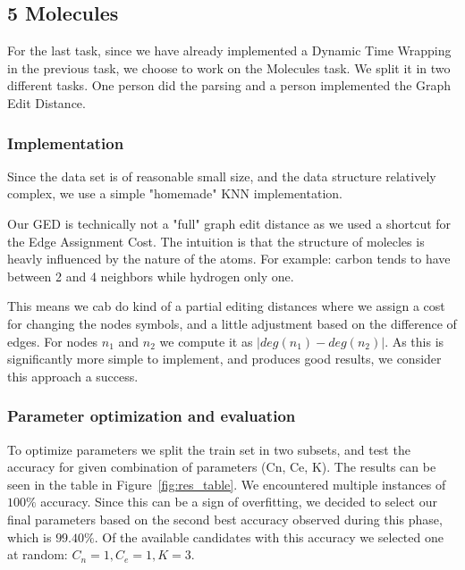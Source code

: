 \documentclass[12pt]{article}
\begin{document}
\subsection*{5 Molecules}
For the last task, since we have already implemented a Dynamic Time Wrapping in the previous task, we choose to work on the Molecules task. We split it in two different tasks. One person did the parsing and a person implemented the Graph Edit Distance.

\subsubsection*{Implementation}

Since the data set is of reasonable small size, and the data structure relatively complex,
we use a simple "homemade" KNN implementation.

Our GED is technically not a "full" graph edit distance as we used a shortcut for the Edge Assignment Cost. The intuition is that the structure of molecles is heavly influenced by the nature of the atoms. For example: carbon tends to have between 2 and 4 neighbors while hydrogen only one.

This means we cab do kind of a partial editing distances where we assign a cost for changing the nodes symbols, and a little adjustment based on the difference of edges. For nodes $n_1$ and $n_2$ we compute it as $|deg(n_1) - deg(n_2)|$. As this is significantly more simple to implement, and produces good results, we consider this approach a success.

\subsubsection*{Parameter optimization and evaluation}

To optimize parameters we split the train set in two subsets, and test the accuracy for given combination of parameters (Cn, Ce, K).
The results can be seen in the table in Figure~\ref{fig:res_table}. We encountered multiple instances of $100\%$ accuracy. Since this can be a sign of overfitting, we decided to select
our final parameters based on the second best accuracy observed during this phase, which is $99.40\%$. Of the available candidates with this accuracy we selected one at random: $C_n = 1, C_e = 1, K = 3$.
\end{document}
